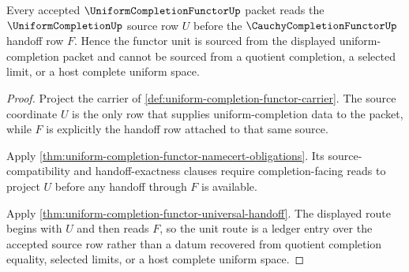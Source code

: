\begin{theorem}
\label{thm:uniform-completion-functor-source-unit-compatibility}
Every accepted $\UniformCompletionFunctorUp$ packet reads the $\UniformCompletionUp$ source row $U$ before the $\CauchyCompletionFunctorUp$ handoff row $F$. Hence the functor unit is sourced from the displayed uniform-completion packet and cannot be sourced from a quotient completion, a selected limit, or a host complete uniform space.
\end{theorem}
\begin{proof}
Project the carrier of \autoref{def:uniform-completion-functor-carrier}. The source coordinate $U$ is the only row that supplies uniform-completion data to the packet, while $F$ is explicitly the handoff row attached to that same source.

Apply \autoref{thm:uniform-completion-functor-namecert-obligations}. Its source-compatibility and handoff-exactness clauses require completion-facing reads to project $U$ before any handoff through $F$ is available.

Apply \autoref{thm:uniform-completion-functor-universal-handoff}. The displayed route begins with $U$ and then reads $F$, so the unit route is a ledger entry over the accepted source row rather than a datum recovered from quotient completion equality, selected limits, or a host complete uniform space.
\end{proof}

